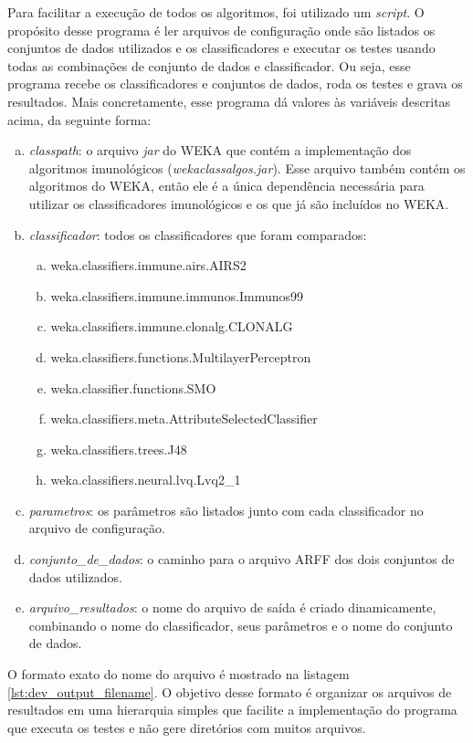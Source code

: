 Para facilitar a execução de todos os algoritmos, foi utilizado um \emph{script}. O propósito desse programa é ler arquivos de configuração onde são listados os conjuntos de dados utilizados e os classificadores e executar os testes usando todas as combinações de conjunto de dados e classificador. Ou seja, esse programa recebe os classificadores e conjuntos de dados, roda os testes e grava os resultados. Mais concretamente, esse programa dá valores às variáveis descritas acima, da seguinte forma:

\begin{enumerate}[a)]
    \item \emph{classpath}: o arquivo \emph{jar} do WEKA que contém a implementação dos algoritmos imunológicos (\emph{wekaclassalgos.jar}). Esse arquivo também contém os algoritmos do WEKA, então ele é a única dependência necessária para utilizar os classificadores imunológicos e os que já são incluídos no WEKA.
    \item \emph{classificador}: todos os classificadores que foram comparados:
        \begin{enumerate}[a)]
            \item weka.classifiers.immune.airs.AIRS2
            \item weka.classifiers.immune.immunos.Immunos99
            \item weka.classifiers.immune.clonalg.CLONALG
            \item weka.classifiers.functions.MultilayerPerceptron
            \item weka.classifier.functions.SMO
            \item weka.classifiers.meta.AttributeSelectedClassifier
            \item weka.classifiers.trees.J48
            \item weka.classifiers.neural.lvq.Lvq2\_1
        \end{enumerate}
    \item \emph{parametros}: os parâmetros são listados junto com cada classificador no arquivo de configuração.
    \item \emph{conjunto\_de\_dados}: o caminho para o arquivo ARFF dos dois conjuntos de dados utilizados.
    \item \emph{arquivo\_resultados}: o nome do arquivo de saída é criado dinamicamente, combinando o nome do classificador, seus parâmetros e o nome do conjunto de dados.
\end{enumerate}

O formato exato do nome do arquivo é mostrado na listagem \ref{lst:dev_output_filename}. O objetivo desse formato é organizar os arquivos de resultados em uma hierarquia simples que facilite a implementação do programa que executa os testes e não gere diretórios com muitos arquivos.


